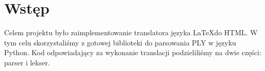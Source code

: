 \chapter{Wstęp}

Celem projektu było zaimplementowanie translatora języka \LaTeX \space do HTML. W tym celu skorzystaliśmy z gotowej
biblioteki do parsowania PLY w języku Python. Kod odpowiadający za wykonanie translacji 
podzieliliśmy na dwie części: parser i lekser.